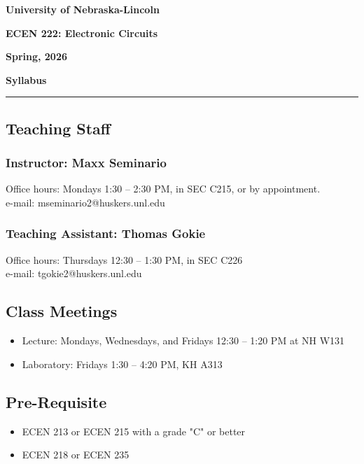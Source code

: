 \documentclass[10pt]{article}
\begin{document}
\doublespacing
\begin{center}
	\textbf{\large University of Nebraska-Lincoln}
	
	\textbf{\large ECEN 222: Electronic Circuits}
	
	\textbf{\large Spring, 2026}
	
	\vspace{2mm}
	
	\textbf{\large Syllabus}
\end{center}
\vspace{-5mm}
\rule{\textwidth}{0.5pt}
\singlespacing

\subsection*{Teaching Staff} 

\subsubsection*{Instructor:  Maxx Seminario} 
Office hours: Mondays 1:30 -- 2:30 PM, in SEC C215, or by appointment.  \\
e-mail: mseminario2@huskers.unl.edu

\subsubsection*{Teaching Assistant: Thomas Gokie} 
Office hours: Thursdays 12:30 -- 1:30 PM, in SEC C226 \\
e-mail: tgokie2@huskers.unl.edu

\subsection*{Class Meetings} 
\begin{itemize}
	\item Lecture: Mondays, Wednesdays, and Fridays 12:30 -- 1:20 PM at NH W131
	\item Laboratory: Fridays 1:30 -- 4:20 PM, KH A313
\end{itemize}

\subsection*{Pre-Requisite} 
\begin{itemize}
	\item ECEN 213 or ECEN 215 with a grade "C" or better
	\item ECEN 218 or ECEN 235
\end{itemize}
\end{document}
